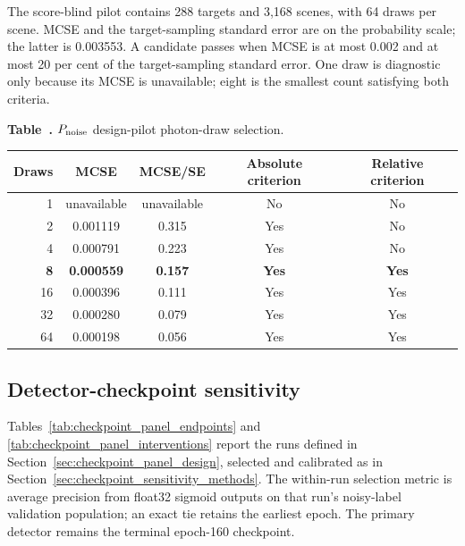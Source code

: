 \noindent\begin{minipage}{\columnwidth}
The score-blind pilot contains 288 targets and 3,168 scenes, with 64 draws per
scene. MCSE and the target-sampling standard error are on the probability scale;
the latter is 0.003553. A candidate passes when MCSE is at most 0.002 and at
most 20 per cent of the target-sampling standard error. One draw is diagnostic
only because its MCSE is unavailable; eight is the smallest count satisfying
both criteria.

\begin{center}
\label{tab:pnoise_draw_pilot}
\noindent\textbf{Table~\thetable.} \(P_{\rm noise}\) design-pilot
photon-draw selection.
\par\smallskip
\scriptsize
\begin{tabular}{rcccc}
\toprule
Draws & MCSE & MCSE/SE & Absolute criterion & Relative criterion \\
\midrule
1  & unavailable & unavailable & No & No \\
2  & 0.001119 & 0.315 & Yes & No \\
4  & 0.000791 & 0.223 & Yes & No \\
\textbf{8}  & \textbf{0.000559} & \textbf{0.157} & \textbf{Yes} & \textbf{Yes} \\
16 & 0.000396 & 0.111 & Yes & Yes \\
32 & 0.000280 & 0.079 & Yes & Yes \\
64 & 0.000198 & 0.056 & Yes & Yes \\
\bottomrule
\end{tabular}
\end{center}
\end{minipage}

\subsection{Detector-checkpoint sensitivity}
\label{app:checkpoint_sensitivity}

Tables~\ref{tab:checkpoint_panel_endpoints} and
\ref{tab:checkpoint_panel_interventions} report the runs defined in
Section~\ref{sec:checkpoint_panel_design}, selected and calibrated as in
Section~\ref{sec:checkpoint_sensitivity_methods}. The within-run selection
metric is average precision from float32 sigmoid outputs on that run's
noisy-label validation population; an exact tie retains the earliest epoch.
The primary detector remains the terminal epoch-160 checkpoint.

